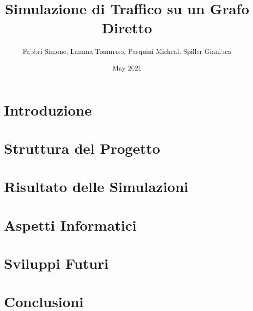 \documentclass{article}
\title{Simulazione di Traffico su un Grafo Diretto}
\author{ Fabbri Simone, Lamma Tommaso, Pasquini Micheal, Spiller Gianluca }
\date{May 2021}
\begin{document}
\maketitle

\tableofcontents

\newpage

\section{Introduzione}

    


\section{Struttura del Progetto}

    


\section{Risultato delle Simulazioni}

    


\section{Aspetti Informatici}

    

\section{Sviluppi Futuri}
\label{section:sviluppi}

    


\section{Conclusioni}

    

    \printbibliography[heading = bibintoc]
\end{document}
